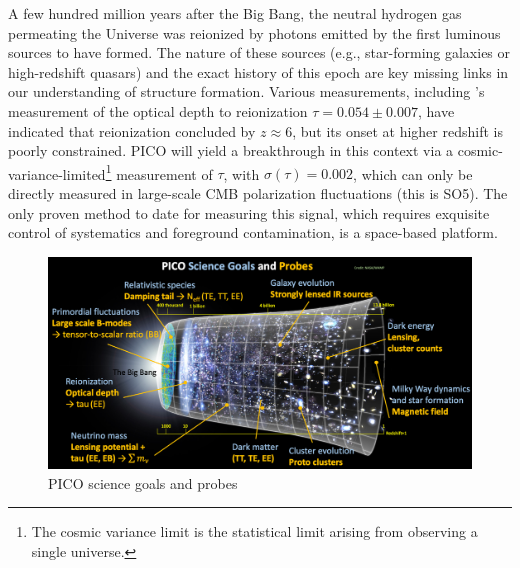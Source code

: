 \documentclass[PICOReport.tex]{subfiles}
\begin{document}
A few hundred million years after the Big Bang, the neutral hydrogen gas permeating the Universe was reionized by photons emitted by the first luminous sources to have formed.  The nature of these sources (e.g., star-forming galaxies or high-redshift quasars) and the exact history of this epoch are key missing links in our understanding of structure formation.  Various measurements, including \planck 's measurement of the optical depth to reionization $\tau = 0.054 \pm 0.007$, have indicated that reionization concluded by $z \approx 6$, but its onset at higher redshift is poorly constrained. PICO will yield a breakthrough in this context via a cosmic-variance-limited\footnote{The cosmic variance limit is the statistical limit arising from observing a single universe.} measurement of $\tau$, with $\sigma(\tau)=0.002$, which can only be directly measured in large-scale CMB polarization fluctuations (this is SO5).  The only proven method to date for measuring this signal, which requires exquisite control of systematics and foreground contamination, is a space-based platform. 

\begin{figure}[!thb]
\centering
\hspace{-0.15in}
\includegraphics[width=5.5in]{images/PICO_science goals and probes.png}
\hspace{-0.15in}
\caption{PICO science goals and probes}
\label{fig:PICOsci_probes}
\end{figure}
\end{document}
